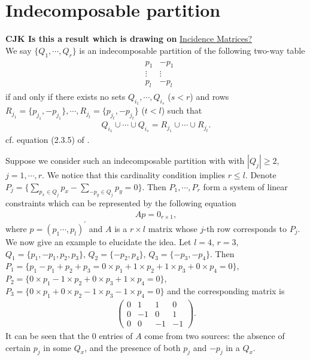 \documentclass[11pt]{article}
\numberwithin{equation}{section}
\theoremstyle{plain}
\theoremstyle{definition}
\theoremstyle{definition}
\theoremstyle{assumption}
\theoremstyle{proposition}
\theoremstyle{proposition}
\theoremstyle{example}
\theoremstyle{lemma}
\theoremstyle{theorem}
\theoremstyle{remark}
\begin{document}
\iffalse
\section{Indecomposable partition}\label{indecomposable_partition_sect}\textbf{CJK Is this a result which is drawing on} \href{https://math.stackexchange.com/questions/2015688/rank-of-an-incidence-matrix-of-a-graph-g-with-n-vertices-is-n-1-implies-that-g-i#:~:text=Rank%20of%20an%20incidence%20matrix%20of%20a,is%20n%2D1%20implies%20that%20G%20is%20connected.&text=I%20know%20that%20when%20a%20graph%20G,matrix%20AG%20has%20rank%20n%E2%88%921%20over%20GF(2).}{Incidence Matrices?} \\

We say $\{Q_1,\cdots,Q_r\}$ is an indecomposable partition of the following two-way table
\begin{align*}
\begin{matrix}
&p_{1}&-p_{1} \\
&\vdots&\vdots \\
&p_l&-p_l
\end{matrix}
\end{align*}
if and only if there exists no sets $Q_{i_1},\cdots,Q_{i_s}$ ($s<r$) and rows $R_{j_1} = \{p_{j_1},-p_{j_1}\},\cdots,R_{j_t} = \{p_{j_t},-p_{j_t}\}$ ($t<l$) such that
\begin{align*}
Q_{i_1}\cup\cdots\cup Q_{i_s} = R_{j_1}\cup\cdots\cup R_{j_t} .
\end{align*}
cf. equation (2.3.5) of \citet{Brillinger2001}.

Suppose we consider such an indecomposable partition with with $|Q_j|\geqslant2$, $j=1,\cdots,r$. We notice that this cardinality condition implies $r\leqslant l$. Denote $P_j = \{\sum_{p_x\in Q_j}p_x - \sum_{-p_y\in Q_j}p_y = 0\}$. Then $P_1,\cdots,P_r$ form a system of linear constraints which can be represented by the following equation
\begin{align*}
A p = 0_{r\times1},
\end{align*}
where $p=(p_1\cdots,p_l)^{\prime}$ and $A$ is a $r\times l$ matrix whose $j$-th row corresponds to $P_j$. We now give an example to elucidate the idea. Let $l=4$, $r=3$, $Q_1=\{p_1,-p_1,p_2,p_3\}$, $Q_2=\{-p_2,p_4\}$, $Q_3=\{-p_3,-p_4\}$. Then $P_1=\{p_1-p_1+p_2+p_3=0\times p_1+1\times p_2+1\times p_3 + 0\times p_4=0\}$, $P_2=\{0\times p_1-1\times p_2+0\times p_3+1\times p_4=0\}$, $P_3=\{0\times p_1+0\times p_2-1\times p_3 -1\times p_4=0\}$ and the corresponding matrix is
\begin{align*}
\begin{pmatrix}
0& 1& 1& 0 \\
0& -1& 0& 1 \\
0& 0& -1& -1 
\end{pmatrix}.
\end{align*}
It can be seen that the 0 entries of $A$ come from two sources: the absence of certain $p_j$ in some $Q_x$, and the presence of both $p_j$ and $-p_j$ in a $Q_x$.
\end{document}

